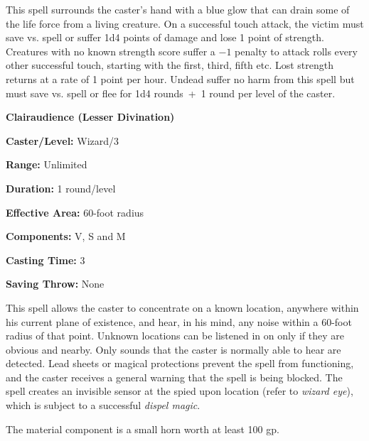 \begin{multicols}{2}
\begin{minipage}{\columnwidth}
\end{minipage}

This spell surrounds the caster's hand with a blue glow that can drain some of the life force from a living creature.  On a successful touch attack, the victim must save vs. spell or suffer 1d4 points of damage and lose 1 point of strength.  Creatures with no known strength score suffer a $-1$ penalty to attack rolls every other successful touch, starting with the first, third, fifth etc.  Lost strength returns at a rate of 1 point per hour.  Undead suffer no harm from this spell but must save vs. spell or flee for 1d4 rounds~+~1 round per level of the caster.

\vspace{1em}

\noindent
\begin{minipage}{\columnwidth}

\noindent \textbf{Clairaudience (Lesser Divination)}

\noindent \textbf{Caster/Level:} Wizard/3

\noindent \textbf{Range:} Unlimited

\noindent \textbf{Duration:} 1 round/level

\noindent \textbf{Effective Area:} 60-foot radius

\noindent \textbf{Components:} V, S and M

\noindent \textbf{Casting Time:} 3

\noindent \textbf{Saving Throw:} None

\end{minipage}

This spell allows the caster to concentrate on a known location, anywhere within his current plane of existence, and hear, in his mind, any noise within a 60-foot radius of that point.  Unknown locations can be listened in on only if they are obvious and nearby.  Only sounds that the caster is normally able to hear are detected.  Lead sheets or magical protections prevent the spell from functioning, and the caster receives a general warning that the spell is being blocked.  The spell creates an invisible sensor at the spied upon location (refer to \textit{wizard eye}), which is subject to a successful \textit{dispel magic}.

The material component is a small horn worth at least 100 gp.

\vspace{1em}

\noindent
\begin{minipage}{\columnwidth}


\end{minipage}
\end{multicols}
